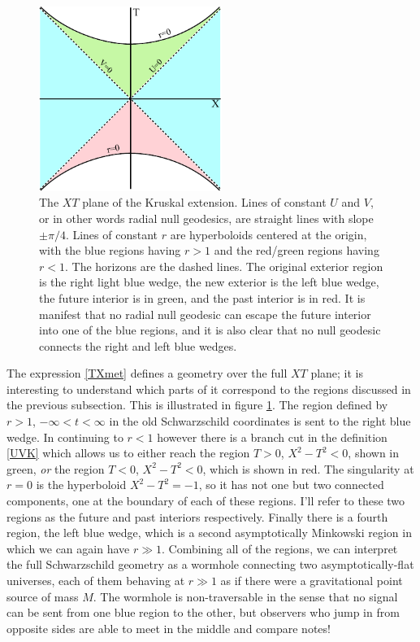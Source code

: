 \documentclass[12pt]{article}
\begin{document}
\begin{figure}
\begin{center}
\includegraphics[height=6cm]{kruskal.pdf}
\caption{The $XT$ plane of the Kruskal extension.  Lines of constant $U$ and $V$, or in other words radial null geodesics, are straight lines with slope $\pm \pi/4$.  Lines of constant $r$ are hyperboloids centered at the origin, with the blue regions having $r>1$ and the red/green regions having $r<1$.  The horizons are the dashed lines.  The original exterior region is the right light blue wedge, the new exterior is the left blue wedge, the future interior is in green, and the past interior is in red.  It is manifest that no radial null geodesic can escape the future interior into one of the blue regions, and it is also clear that no null geodesic connects the right and left blue wedges.}\label{kruskfig}
\end{center}
\end{figure}
The expression \eqref{TXmet} defines a geometry over the full $XT$ plane; it is interesting to understand which parts of it correspond to the regions discussed in the previous subsection.  This is illustrated in figure \ref{kruskfig}.  The region defined by $r>1$, $-\infty<t<\infty$ in the old Schwarzschild coordinates is sent to the right blue wedge.  In continuing to $r<1$ however there is a branch cut in the definition \eqref{UVK} which allows us to either reach the region $T>0$, $X^2-T^2<0$, shown in green, \textit{or} the region $T<0$, $X^2-T^2<0$, which is shown in red.  The singularity at $r=0$ is the hyperboloid $X^2-T^2=-1$, so it has not one but two connected components, one at the boundary of each of these regions.  I'll refer to these two regions as the future and past interiors respectively.  Finally there is a fourth region, the left blue wedge, which is a second asymptotically Minkowski region in which we can again have $r\gg 1$.  Combining all of the regions, we can interpret the full Schwarzschild geometry as a wormhole connecting two asymptotically-flat universes, each of them behaving at $r\gg 1$ as if there were a gravitational point source of mass $M$.  The wormhole is non-traversable in the sense that no signal can be sent from one blue region to the other, but observers who jump in from opposite sides are able to meet in the middle and compare notes!
\end{document}
